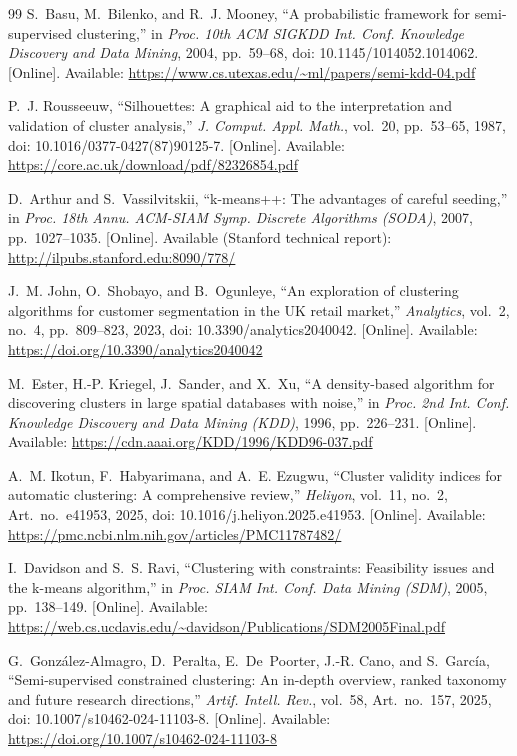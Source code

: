 \documentclass[conference,10pt]{IEEEtran}
\begin{document}
\begin{thebibliography}{99}
S.~Basu, M.~Bilenko, and R.~J. Mooney, ``A probabilistic framework for
semi-supervised clustering,'' in \emph{Proc. 10th ACM SIGKDD Int. Conf.
Knowledge Discovery and Data Mining}, 2004, pp.~59--68,
doi: 10.1145/1014052.1014062. [Online]. Available:
\url{https://www.cs.utexas.edu/~ml/papers/semi-kdd-04.pdf}

P.~J. Rousseeuw, ``Silhouettes: A graphical aid to the interpretation and
validation of cluster analysis,'' \emph{J. Comput. Appl. Math.}, vol.~20,
pp.~53--65, 1987, doi: 10.1016/0377-0427(87)90125-7. [Online]. Available:
\url{https://core.ac.uk/download/pdf/82326854.pdf}

D.~Arthur and S.~Vassilvitskii, ``k-means++: The advantages of careful
seeding,'' in \emph{Proc. 18th Annu. ACM-SIAM Symp. Discrete Algorithms
(SODA)}, 2007, pp.~1027--1035. [Online]. Available (Stanford technical
report): \url{http://ilpubs.stanford.edu:8090/778/}

J.~M. John, O.~Shobayo, and B.~Ogunleye, ``An exploration of clustering
algorithms for customer segmentation in the UK retail market,''
\emph{Analytics}, vol.~2, no.~4, pp.~809--823, 2023,
doi: 10.3390/analytics2040042. [Online]. Available:
\url{https://doi.org/10.3390/analytics2040042}

M.~Ester, H.-P. Kriegel, J.~Sander, and X.~Xu, ``A density-based algorithm
for discovering clusters in large spatial databases with noise,'' in
\emph{Proc. 2nd Int. Conf. Knowledge Discovery and Data Mining (KDD)}, 1996,
pp.~226--231. [Online]. Available:
\url{https://cdn.aaai.org/KDD/1996/KDD96-037.pdf}

A.~M. Ikotun, F.~Habyarimana, and A.~E. Ezugwu, ``Cluster validity indices
for automatic clustering: A comprehensive review,'' \emph{Heliyon}, vol.~11,
no.~2, Art.~no.~e41953, 2025, doi: 10.1016/j.heliyon.2025.e41953. [Online].
Available: \url{https://pmc.ncbi.nlm.nih.gov/articles/PMC11787482/}

I.~Davidson and S.~S. Ravi, ``Clustering with constraints: Feasibility
issues and the k-means algorithm,'' in \emph{Proc. SIAM Int. Conf. Data
Mining (SDM)}, 2005, pp.~138--149. [Online]. Available:
\url{https://web.cs.ucdavis.edu/~davidson/Publications/SDM2005Final.pdf}

G.~Gonz\'alez-Almagro, D.~Peralta, E.~De~Poorter, J.-R. Cano, and
S.~Garc\'ia, ``Semi-supervised constrained clustering: An in-depth overview,
ranked taxonomy and future research directions,'' \emph{Artif. Intell.
Rev.}, vol.~58, Art.~no.~157, 2025, doi: 10.1007/s10462-024-11103-8.
[Online]. Available: \url{https://doi.org/10.1007/s10462-024-11103-8}


\end{thebibliography}
\end{document}
